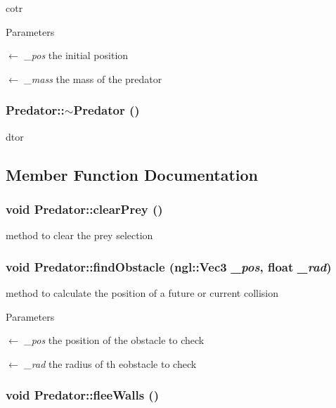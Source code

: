 cotr 
\begin{DoxyParams}{Parameters}
\item[\mbox{$\leftarrow$} {\em \_\-pos}]the initial position \item[\mbox{$\leftarrow$} {\em \_\-mass}]the mass of the predator \end{DoxyParams}
\hypertarget{classPredator_a9ef1a4a3a5988d1d1e5844a235b36b8b}{
\subsubsection[{$\sim$Predator}]{\setlength{\rightskip}{0pt plus 5cm}Predator::$\sim$Predator ()}}
\label{classPredator_a9ef1a4a3a5988d1d1e5844a235b36b8b}


dtor 

\subsection{Member Function Documentation}
\hypertarget{classPredator_a8bfb4bcdf2a341ff8a4602a316c8b842}{
\subsubsection[{clearPrey}]{\setlength{\rightskip}{0pt plus 5cm}void Predator::clearPrey ()}}
\label{classPredator_a8bfb4bcdf2a341ff8a4602a316c8b842}


method to clear the prey selection \hypertarget{classPredator_ac64cea17ca069465ffdc6e70161afe84}{
\subsubsection[{findObstacle}]{\setlength{\rightskip}{0pt plus 5cm}void Predator::findObstacle (ngl::Vec3 {\em \_\-pos}, \/  float {\em \_\-rad})}}
\label{classPredator_ac64cea17ca069465ffdc6e70161afe84}


method to calculate the position of a future or current collision 
\begin{DoxyParams}{Parameters}
\item[\mbox{$\leftarrow$} {\em \_\-pos}]the position of the obstacle to check \item[\mbox{$\leftarrow$} {\em \_\-rad}]the radius of th eobstacle to check \end{DoxyParams}
\hypertarget{classPredator_a1ab812d7b3fc4720eac4b106b40d8800}{
\subsubsection[{fleeWalls}]{\setlength{\rightskip}{0pt plus 5cm}void Predator::fleeWalls ()}}
\label{classPredator_a1ab812d7b3fc4720eac4b106b40d8800}


